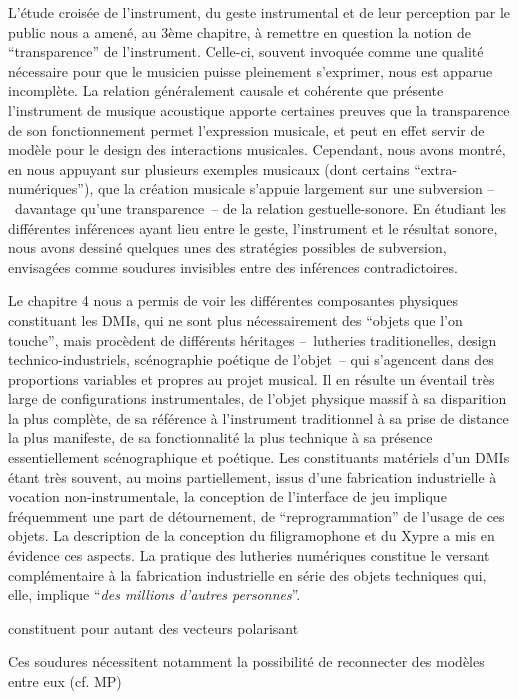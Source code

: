 L'étude croisée de l'instrument, du geste instrumental et de leur perception par le public nous a amené, au 3ème chapitre, à remettre en question la notion de ``transparence'' de l'instrument. Celle-ci, souvent invoquée comme une qualité nécessaire pour que le musicien puisse pleinement s'exprimer, nous est apparue incomplète. La relation généralement causale et cohérente que présente l'instrument de musique acoustique apporte certaines preuves que la transparence de son fonctionnement permet l'expression musicale, et peut en effet servir de modèle pour le design des interactions musicales. Cependant, nous avons montré, en nous appuyant sur plusieurs exemples musicaux (dont certains ``extra-numériques''), que la création musicale s'appuie largement sur une subversion --~davantage qu'une transparence~-- de la relation gestuelle-sonore. En étudiant les différentes inférences ayant lieu entre le geste, l'instrument et le résultat sonore, nous avons dessiné quelques unes des stratégies possibles de subversion, envisagées comme soudures invisibles entre des inférences contradictoires.


Le chapitre 4 nous a permis de voir les différentes composantes physiques constituant les \glspl{DMI}, qui ne sont plus nécessairement des ``objets que l'on touche'', mais procèdent de différents héritages --~lutheries traditionelles, design technico-industriels, scénographie poétique de l'objet~-- qui s'agencent dans des proportions variables et propres au projet musical. Il en résulte un éventail très large de configurations instrumentales, de l'objet physique massif à sa disparition la plus complète, de sa référence à l'instrument traditionnel à sa prise de distance la plus manifeste, de sa fonctionnalité la plus technique à sa présence essentiellement scénographique et poétique.
Les constituants matériels d'un \glspl{DMI} étant très souvent, au moins partiellement, issus d'une fabrication industrielle à vocation non-instrumentale, la conception de l'interface de jeu implique fréquemment une part de détournement, de ``reprogrammation'' de l'usage de ces objets. La description de la conception du filigramophone et du Xypre a mis en évidence ces aspects. La pratique  des lutheries numériques constitue le versant complémentaire à la fabrication industrielle en série des objets techniques qui, elle, implique ``\textit{des millions d'autres personnes}''.

constituent pour autant des vecteurs polarisant 

Ces soudures nécessitent notamment la possibilité de reconnecter des modèles entre eux (cf. MP)


